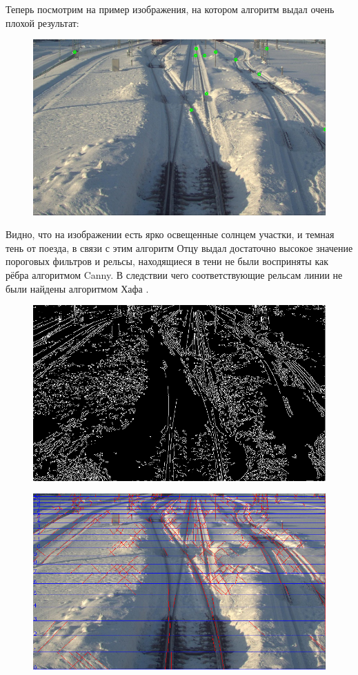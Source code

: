 \newpage
Теперь посмотрим на пример изображения, на котором алгоритм выдал очень плохой результат:
\begin{figure}[h!]
	\centering
	\includegraphics[width=0.7\linewidth]{pictures/screenshot0018}
	\caption{}
	\label{fig:res4}
\end{figure}
Видно, что на изображении есть ярко освещенные солнцем участки, и темная тень от поезда, в связи с этим алгоритм Отцу \cite{b:otsu} выдал достаточно высокое значение пороговых фильтров и рельсы, находящиеся в тени не были восприняты как рёбра алгоритмом Canny\cite{b:canny}. В следствии чего соответствующие рельсам линии не были найдены алгоритмом Хафа \cite{b:hough_transform}.
\begin{figure}[h!]
	\centering
	\includegraphics[width=0.7\linewidth]{pictures/screenshot0019}
	\caption{}
	\label{fig:bad_canny}
\end{figure}
\begin{figure}[h!]
	\centering
	\includegraphics[width=0.7\linewidth]{pictures/screenshot0020}
	\caption{}
	\label{fig:bad_lines}
\end{figure}

